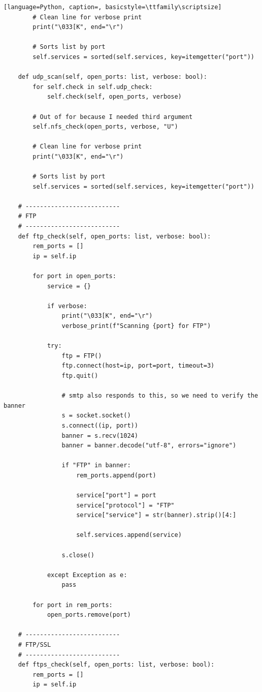\documentclass[12pt]{report}
\begin{document}
\begin{lstlisting}[language=Python, caption=, basicstyle=\ttfamily\scriptsize]
        # Clean line for verbose print
        print("\033[K", end="\r")

        # Sorts list by port
        self.services = sorted(self.services, key=itemgetter("port"))

    def udp_scan(self, open_ports: list, verbose: bool):
        for self.check in self.udp_check:
            self.check(self, open_ports, verbose)

        # Out of for because I needed third argument
        self.nfs_check(open_ports, verbose, "U")

        # Clean line for verbose print
        print("\033[K", end="\r")

        # Sorts list by port
        self.services = sorted(self.services, key=itemgetter("port"))

    # --------------------------
    # FTP
    # --------------------------
    def ftp_check(self, open_ports: list, verbose: bool):
        rem_ports = []
        ip = self.ip

        for port in open_ports:
            service = {}

            if verbose:
                print("\033[K", end="\r")
                verbose_print(f"Scanning {port} for FTP")

            try:
                ftp = FTP()
                ftp.connect(host=ip, port=port, timeout=3)
                ftp.quit()

                # smtp also responds to this, so we need to verify the banner
                s = socket.socket()
                s.connect((ip, port))
                banner = s.recv(1024)
                banner = banner.decode("utf-8", errors="ignore")

                if "FTP" in banner:
                    rem_ports.append(port)

                    service["port"] = port
                    service["protocol"] = "FTP"
                    service["service"] = str(banner).strip()[4:]

                    self.services.append(service)

                s.close()

            except Exception as e:
                pass

        for port in rem_ports:
            open_ports.remove(port)

    # --------------------------
    # FTP/SSL
    # --------------------------
    def ftps_check(self, open_ports: list, verbose: bool):
        rem_ports = []
        ip = self.ip


\end{lstlisting}
\end{document}
